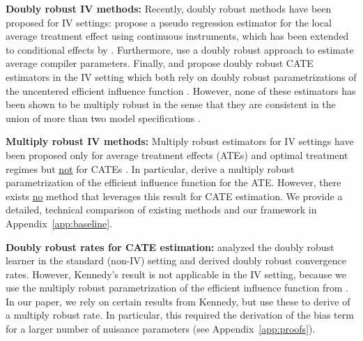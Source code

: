 \documentclass{article} %
\theoremstyle{definition}
\theoremstyle{plain}
\begin{document}
\begin{table}
\vspace{-1.2cm}
\caption{Key methods for causal effect estimation with IVs and associated robustness properties}
\label{tab:rel_work}
\vspace{-0.4cm}
\end{table}

\textbf{Doubly robust IV methods:} Recently, doubly robust methods have been proposed for IV settings: \citet{Kennedy.2019} propose a pseudo regression estimator for the local average treatment effect using continuous instruments, which has been extended to conditional effects by \citet{Semenova.2021}. Furthermore, \citet{Singh.2019b} use a doubly robust approach to estimate average compiler parameters. Finally, \citet{Ogburn.2015} and \citet{Syrgkanis.2019} propose doubly robust CATE estimators in the IV setting which both rely on doubly robust parametrizations of the uncentered efficient influence function \citep{Okui.2012}. However, none of these estimators has been shown to be multiply robust in the sense that they are consistent in the union of more than two model specifications \citep{Wang.2018}.


\textbf{Multiply robust IV methods:} Multiply robust estimators for IV settings have been proposed only for average treatment effects (ATEs) \citep{Wang.2018} and optimal treatment regimes \citep{Cui.2021} but \underline{not} for CATEs . In particular, \citet{Wang.2018} derive a multiply robust parametrization of the efficient influence function for the ATE. However, there exists \underline{no} method that leverages this result for CATE estimation. %
We provide a detailed, technical comparison of existing methods and our framework in Appendix~\ref{app:baseline}.

\textbf{Doubly robust rates for CATE estimation:} \citet{Kennedy.2022d} analyzed the doubly robust learner in the standard (non-IV) setting and derived doubly robust convergence rates. However, Kennedy's result is not applicable in the IV setting, because we use the multiply robust parametrization of the efficient influence function from \citet{Wang.2018}. In our paper, we rely on certain results from Kennedy, but use these to derive of a multiply robust rate. In particular, this required the derivation of the bias term for a larger number of nuisance parameters (see Appendix~\ref{app:proofs}).
\end{document}
